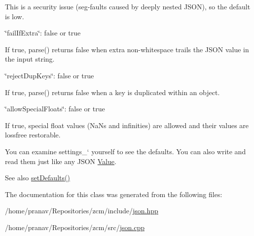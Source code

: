 \begin{DoxyItemize}
\begin{DoxyItemize}
\item This is a security issue (seg-\/faults caused by deeply nested J\+S\+ON), so the default is low.
\end{DoxyItemize}
\item {\ttfamily \char`\"{}fail\+If\+Extra\char`\"{}\+: false or true}
\begin{DoxyItemize}
\item If true, {\ttfamily parse()} returns false when extra non-\/whitespace trails the J\+S\+ON value in the input string.
\end{DoxyItemize}
\item {\ttfamily \char`\"{}reject\+Dup\+Keys\char`\"{}\+: false or true}
\begin{DoxyItemize}
\item If true, {\ttfamily parse()} returns false when a key is duplicated within an object.
\end{DoxyItemize}
\item {\ttfamily \char`\"{}allow\+Special\+Floats\char`\"{}\+: false or true}
\begin{DoxyItemize}
\item If true, special float values (Na\+Ns and infinities) are allowed and their values are lossfree restorable.
\end{DoxyItemize}
\end{DoxyItemize}

You can examine \textquotesingle{}settings\+\_\+` yourself to see the defaults. You can also write and read them just like any J\+S\+ON \hyperlink{classJson_1_1Value}{Value}. \begin{DoxySeeAlso}{See also}
\hyperlink{classJson_1_1CharReaderBuilder_a03ff031e06aabff989ab4addc87294ab}{set\+Defaults()} 
\end{DoxySeeAlso}


The documentation for this class was generated from the following files\+:\begin{DoxyCompactItemize}
\item 
/home/pranav/\+Repositories/zcm/include/\hyperlink{json_8hpp}{json.\+hpp}\item 
/home/pranav/\+Repositories/zcm/src/\hyperlink{json_8cpp}{json.\+cpp}\end{DoxyCompactItemize}

